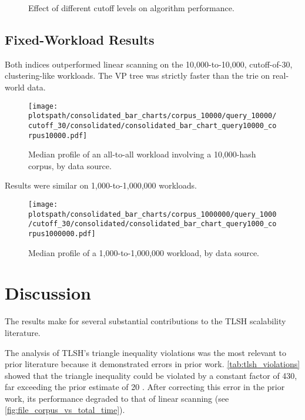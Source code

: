 \documentclass[5p,final]{elsarticle}
\newcommand{\plotspath}{paper-dependencies/latex-dependencies/plots}
\begin{document}
\begin{figure*}
	\vspace{1em}

	\caption{Effect of different cutoff levels on algorithm performance.}
	\label{fig:comparison_2}
\end{figure*}

\clearpage

\subsection{Fixed-Workload Results}
Both indices outperformed linear scanning on the 10,000-to-10,000,
cutoff-of-30, clustering-like workloads. The VP tree was strictly
faster than the trie on real-world data.

\begin{figure}[H]
	\centering
	\texttt{[image: \\plotspath/consolidated\_bar\_charts/corpus\_10000/query\_10000/cutoff\_30/consolidated/consolidated\_bar\_chart\_query10000\_corpus10000.pdf]}
	\caption{Median profile of an all-to-all workload involving a
	10,000-hash corpus, by data source.}
	\label{fig:all_to_all_bar_chart}
\end{figure}

Results were similar on 1,000-to-1,000,000 workloads.

\begin{figure}[H]
	\centering
	\texttt{[image: \\plotspath/consolidated\_bar\_charts/corpus\_1000000/query\_1000/cutoff\_30/consolidated/consolidated\_bar\_chart\_query1000\_corpus1000000.pdf]}
	\caption{Median profile of a 1,000-to-1,000,000 workload,
	by data source.}
	\label{fig:1k_to_1m_chart}
\end{figure}

\section{Discussion}

The results make for several substantial contributions to the TLSH
scalability literature.

The analysis of TLSH's triangle inequality violations was the most
relevant to prior literature because it demonstrated errors in prior
work. \autoref{tab:tlsh_violations} showed that the triangle
inequality could be violated by a constant factor of 430, far
exceeding the prior estimate of 20
\cite{oliverTlshTlshClusterPylib2021}. After correcting this error in
the prior work, its performance degraded to that of linear scanning
(see \autoref{fig:file_corpus_vs_total_time}).
\end{document}
